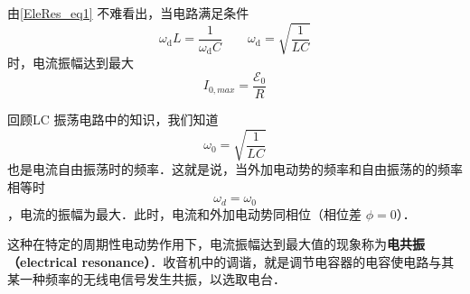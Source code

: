 由\autoref{EleRes_eq1} 不难看出，当电路满足条件
\begin{equation}
\omega_{\mathrm{d}} L=\dfrac{1}{\omega_{\mathrm{d}} C}
\qquad 
\omega_{\mathrm{d}}=\sqrt{\frac{1}{L C}}
\end{equation}
时，电流振幅达到最大
$$I_{0,max}=\dfrac{\mathscr{E}_{0}}{R}$$

回顾LC 振荡电路中的知识，我们知道$$\omega_0 = \sqrt{\frac{1}{LC}}$$也是电流自由振荡时的频率．这就是说，当外加电动势的频率和自由振荡的的频率相等时$$\omega_d=\omega_0$$，电流的振幅为最大．此时，电流和外加电动势同相位（相位差 $\phi=0$）．

这种在特定的周期性电动势作用下，电流振幅达到最大值的现象称为\textbf{电共振（electrical resonance）}．收音机中的调谐，就是调节电容器的电容使电路与其某一种频率的无线电信号发生共振，以选取电台．

